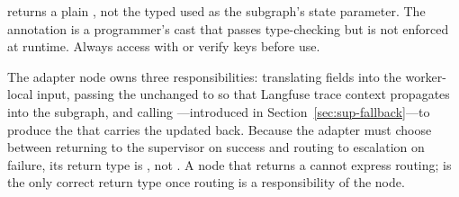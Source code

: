 \begin{notebox}
 returns a plain , not the
typed  used as the subgraph's state parameter. The
annotation 
is a programmer's cast that passes type-checking but is not enforced at
runtime. Always access  with  or verify keys
before use.
\end{notebox}

The adapter node owns three responsibilities: translating 
fields into the worker-local input, passing the 
unchanged to  so that Langfuse trace context propagates into
the subgraph, and calling ---introduced in
Section~\ref{sec:sup-fallback}---to produce the  that
carries the updated  back. Because the adapter must
choose between returning to the supervisor on success and routing to
escalation on failure, its return type is
, not . A node
that returns a  cannot express routing;  is the
only correct return type once routing is a responsibility of the node.

